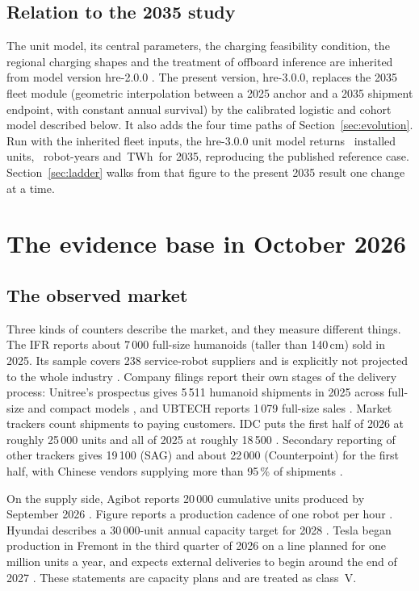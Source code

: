 \documentclass[11pt]{article}
\newcommand{\TWh}{\,TWh}
\newcommand{\secref}[1]{Section~\ref{#1}}
\begin{document}
\subsection{Relation to the 2035 study}
The unit model, its central parameters, the charging feasibility condition, the regional charging shapes and the treatment of offboard inference are inherited from model version hre-2.0.0 \citep{merilehto2026a,merilehto2026b}. The present version, hre-3.0.0, replaces the 2035 fleet module (geometric interpolation between a 2025 anchor and a 2035 shipment endpoint, with constant annual survival) by the calibrated logistic and cohort model described below. It also adds the four time paths of \secref{sec:evolution}. Run with the inherited fleet inputs, the hre-3.0.0 unit model returns \LegacyStock\ installed units, \LegacyRY\ robot-years and \LegacyTWh\TWh\ for 2035, reproducing the published reference case. \secref{sec:ladder} walks from that figure to the present 2035 result one change at a time.

\section{The evidence base in October 2026}\label{sec:evidence}

\subsection{The observed market}
Three kinds of counters describe the market, and they measure different things. The IFR reports about 7\,000 full-size humanoids (taller than 140\,cm) sold in 2025. Its sample covers 238 service-robot suppliers and is explicitly not projected to the whole industry \citep{ifr2026service}. Company filings report their own stages of the delivery process: Unitree's prospectus gives 5\,511 humanoid shipments in 2025 across full-size and compact models \citep{unitree2026}, and UBTECH reports 1\,079 full-size sales \citep{ubtech2026}. Market trackers count shipments to paying customers. IDC puts the first half of 2026 at roughly 25\,000 units and all of 2025 at roughly 18\,500 \citep{idc2026blog}. Secondary reporting of other trackers gives 19\,100 (SAG) and about 22\,000 (Counterpoint) for the first half, with Chinese vendors supplying more than 95\,\% of shipments \citep{idc2026}.

On the supply side, Agibot reports 20\,000 cumulative units produced by September 2026 \citep{idc2026}. Figure reports a production cadence of one robot per hour \citep{figure2026}. Hyundai describes a 30\,000-unit annual capacity target for 2028 \citep{hyundai2026}. Tesla began production in Fremont in the third quarter of 2026 on a line planned for one million units a year, and expects external deliveries to begin around the end of 2027 \citep{tesla2026q3,notatesla2026}. These statements are capacity plans and are treated as class~V.
\end{document}
